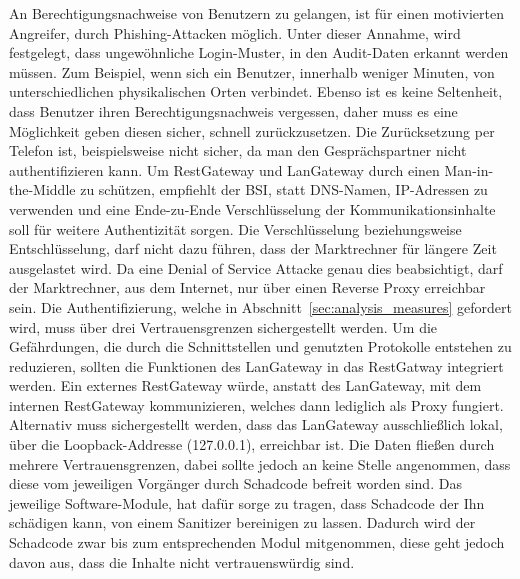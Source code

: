 \documentclass[11pt,a4paper]{report}
\begin{document}
An Berechtigungsnachweise von Benutzern zu gelangen, ist für einen motivierten Angreifer, durch Phishing-Attacken möglich. Unter dieser Annahme, wird festgelegt, dass ungewöhnliche Login-Muster, in den Audit-Daten erkannt werden müssen. Zum Beispiel, wenn sich ein Benutzer, innerhalb weniger Minuten, von unterschiedlichen physikalischen Orten verbindet. Ebenso ist es keine Seltenheit, dass Benutzer ihren Berechtigungsnachweis vergessen, daher muss es eine Möglichkeit geben diesen sicher, schnell zurückzusetzen. Die Zurücksetzung per Telefon ist, beispielsweise nicht sicher, da man den Gesprächspartner nicht authentifizieren kann. Um RestGateway und LanGateway durch einen Man-in-the-Middle zu schützen, empfiehlt der BSI, statt DNS-Namen, IP-Adressen zu verwenden \cite{bsi_m559} und eine Ende-zu-Ende Verschlüsselung der Kommunikationsinhalte soll für weitere Authentizität sorgen. Die Verschlüsselung beziehungsweise Entschlüsselung, darf nicht dazu führen, dass der Marktrechner für längere Zeit ausgelastet wird. Da eine Denial of Service Attacke genau dies beabsichtigt, darf der Marktrechner, aus dem Internet, nur über einen Reverse Proxy erreichbar sein. Die Authentifizierung, welche in Abschnitt~\ref{sec:analysis_measures} gefordert wird, muss über drei Vertrauensgrenzen sichergestellt werden. Um die Gefährdungen, die durch die Schnittstellen und genutzten Protokolle entstehen zu reduzieren, sollten die Funktionen des LanGateway in das RestGatway integriert werden. Ein externes RestGateway würde, anstatt des LanGateway, mit dem internen RestGateway kommunizieren, welches dann lediglich als Proxy fungiert. Alternativ muss sichergestellt werden, dass das LanGateway ausschließlich lokal, über die Loopback-Addresse (127.0.0.1), erreichbar ist. Die Daten fließen durch mehrere Vertrauensgrenzen, dabei sollte jedoch an keine Stelle angenommen, dass diese vom jeweiligen Vorgänger durch Schadcode befreit worden sind. Das jeweilige Software-Module, hat dafür sorge zu tragen, dass Schadcode der Ihn schädigen kann, von einem Sanitizer bereinigen zu lassen. Dadurch wird der Schadcode zwar bis zum entsprechenden Modul mitgenommen, diese geht jedoch davon aus, dass die Inhalte nicht vertrauenswürdig sind.

\end{document}
